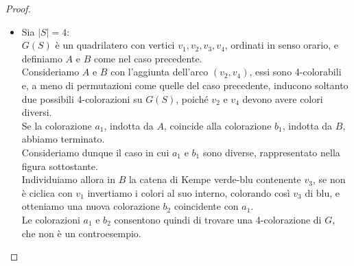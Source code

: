 \documentclass[a4paper,12pt,titlepage]{report}
\begin{document}
\begin{proof}
\begin{itemize}
\begin{figure}[H]
    			\vspace{0.5cm}
    			\caption{Nell'esempio in figura, supponiamo che la prima sia la 4-colorazione di $G(S)$ indotta da $A$ e che la seconda sia quella indotta da $B$. Sarà sufficiente, nella colorazione di $B$, permutare il colore rosso con il blu, il giallo con il rosso e il blu con il giallo, in questo modo le due colorazioni saranno coincidenti.}
    		\end{figure}
    		\item Sia $\lvert S \rvert = 4$:
    		\\$G(S)$ è un quadrilatero con vertici $v_1, v_2, v_3, v_4$, ordinati in senso orario, e definiamo $A$ e $B$ come nel caso precedente.
    		\\Consideriamo $A$ e $B$ con l'aggiunta dell'arco $(v_2, v_4)$, essi sono 4-colorabili e, a meno di permutazioni come quelle del caso precedente, inducono soltanto due possibili 4-colorazioni su $G(S)$, poiché $v_2$ e $v_4$ devono avere colori diversi.
    		\\Se la colorazione $a_1$, indotta da $A$, coincide alla colorazione $b_1$, indotta da $B$, abbiamo terminato.
    		\\Consideriamo dunque il caso in cui $a_1$ e $b_1$ sono diverse, rappresentato nella figura sottostante.
    		\\Individuiamo allora in $B$ la catena di Kempe verde-blu contenente $v_3$, se non è ciclica con $v_1$ invertiamo i colori al suo interno, colorando così $v_3$ di blu, e otteniamo una nuova colorazione $b_2$ coincidente con $a_1$.
    		\\Le colorazioni $a_1$ e $b_2$ consentono quindi di trovare una 4-colorazione di $G$, che non è un controesempio.
    		\begin{figure}[H]
    			\centering
    			\begin{subfigure}{0.3\textwidth}
    				\centering
\end{subfigure}
\end{figure}
\end{itemize}
\end{proof}
\end{document}
